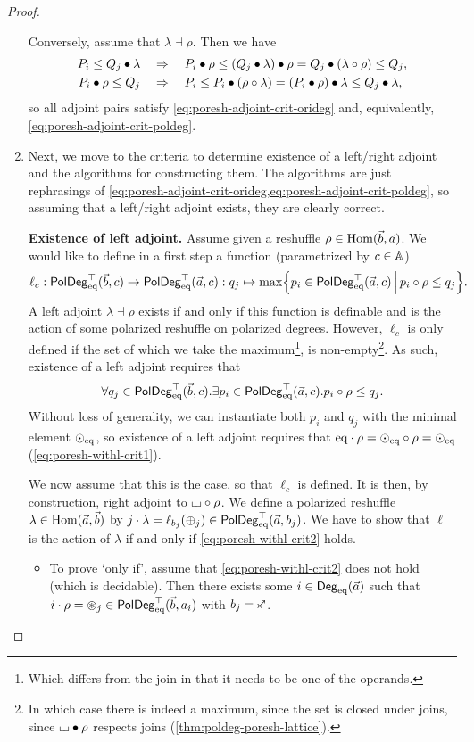 \documentclass[a4paper]{memoir}
\begin{document}
\begin{proof}
\begin{enumerate}
		Conversely, assume that $\lambda \dashv \rho$. Then we have
		\begin{align*}
			P_i \leq Q_j \mathbin{\bullet} \lambda &\quad\Rightarrow\quad P_i \mathbin{\bullet} \rho \leq (Q_j \mathbin{\bullet} \lambda) \mathbin{\bullet} \rho = Q_j \mathbin{\bullet} (\lambda \circ \rho) \leq Q_j, \\
			P_i \mathbin{\bullet} \rho \leq Q_j &\quad\Rightarrow\quad P_i \leq P_i \mathbin{\bullet} (\rho \circ \lambda) = (P_i \mathbin{\bullet} \rho) \mathbin{\bullet} \lambda \leq Q_j \mathbin{\bullet} \lambda,
		\end{align*}
		so all adjoint pairs satisfy \cref{eq:poresh-adjoint-crit-orideg} and, equivalently, \cref{eq:poresh-adjoint-crit-poldeg}.
		
		\item Next, we move to the criteria to determine existence of a left/right adjoint and the algorithms for constructing them.
		The algorithms are just rephrasings of \cref{eq:poresh-adjoint-crit-orideg,eq:poresh-adjoint-crit-poldeg}, so assuming that a left/right adjoint exists, they are clearly correct.
		
		\textbf{Existence of left adjoint.} Assume given a reshuffle $\rho \in {\mathrm{Hom}}(\vec b, \vec a)$.
		We would like to define in a first step a function (parametrized by $c \in {\mathbb{A}}$)
		\[
			\ell_c : \mathsf{PolDeg}_{\mathrm{eq}}^\top(\vec b, c) \to \mathsf{PolDeg}_{\mathrm{eq}}^\top(\vec a, c) : q_j \mapsto \max \mathopen{}\left\{ p_i \in \mathsf{PolDeg}_{\mathrm{eq}}^\top(\vec a, c) \,\middle|\, p_i \circ \rho \leq q_j \right\}\mathclose{}.
		\]
		A left adjoint $\lambda \dashv \rho$ exists if and only if this function is definable and is the action of some polarized reshuffle on polarized degrees.
		However, $\ell_c$ is only defined if the set of which we take the maximum\footnote{Which differs from the join in that it needs to be one of the operands.}, is non-empty\footnote{In which case there is indeed a maximum, since the set is closed under joins, since ${\llcorner\hspace{-.4ex}\lrcorner} \mathbin{\bullet} \rho$ respects joins (\cref{thm:poldeg-poresh-lattice}).}.
		As such, existence of a left adjoint requires that
		\[
			\forall q_j \in \mathsf{PolDeg}_{\mathrm{eq}}^\top(\vec b, c). \exists p_i \in \mathsf{PolDeg}_{\mathrm{eq}}^\top(\vec a, c).p_i \circ \rho \leq q_j.
		\]
		Without loss of generality, we can instantiate both $p_i$ and $q_j$ with the minimal element ${\odot}_{\mathrm{eq}}$, so existence of a left adjoint requires that ${\mathrm{eq}} \cdot \rho = {\odot}_{\mathrm{eq}} \circ \rho = {\odot}_{\mathrm{eq}}$ (\cref{eq:poresh-withl-crit1}).
		
		We now assume that this is the case, so that $\ell_c$ is defined.
		It is then, by construction, right adjoint to ${\llcorner\hspace{-.4ex}\lrcorner} \circ \rho$.
		We define a polarized reshuffle $\lambda \in {\mathrm{Hom}}(\vec a, \vec b)$ by $j \cdot \lambda = \ell_{b_j}({\oplus}_j) \in \mathsf{PolDeg}_{\mathrm{eq}}^\top(\vec a, b_j)$.
		We have to show that $\ell$ is the action of $\lambda$ if and only if \cref{eq:poresh-withl-crit2} holds.
		\begin{itemize}
			\item To prove `only if', assume that \cref{eq:poresh-withl-crit2} does not hold (which is decidable). Then there exists some $i \in {\mathsf{Deg}_{\mathrm{eq}}}(\vec a)$ such that $i \cdot \rho = {\oast}_j \in \mathsf{PolDeg}_{\mathrm{eq}}^\top(\vec b, a_i)$ with $b_j = \ypolar$.
			

\end{itemize}
\end{enumerate}
\end{proof}
\end{document}
